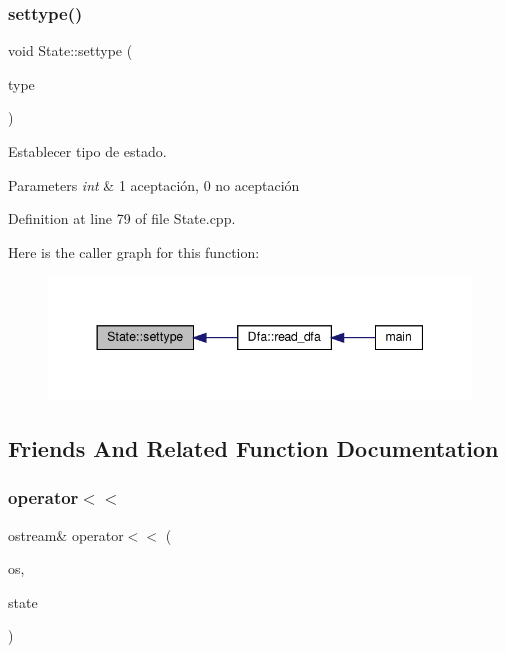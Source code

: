 \subsubsection{\texorpdfstring{settype()}{settype()}}
{\footnotesize\ttfamily void State\+::settype (\begin{DoxyParamCaption}\item[{unsigned int \&}]{type }\end{DoxyParamCaption})}



Establecer tipo de estado. 


\begin{DoxyParams}{Parameters}
{\em int} & 1 aceptación, 0 no aceptación \\
\hline
\end{DoxyParams}


Definition at line 79 of file State.\+cpp.

Here is the caller graph for this function\+:
\nopagebreak
\begin{figure}[H]
\begin{center}
\leavevmode
\includegraphics[width=344pt]{class_state_af24ca7913f14e5e73bcead784b4f322d_icgraph}
\end{center}
\end{figure}


\subsection{Friends And Related Function Documentation}
\mbox{\label{class_state_a9e1d00045023572e9e6dc0d0a199e49a}} 
\subsubsection{\texorpdfstring{operator$<$$<$}{operator<<}}
{\footnotesize\ttfamily ostream\& operator$<$$<$ (\begin{DoxyParamCaption}\item[{ostream \&}]{os,  }\item[{const \hyperlink{class_state}{State} \&}]{state }\end{DoxyParamCaption})\hspace{0.3cm}{\ttfamily [friend]}}




